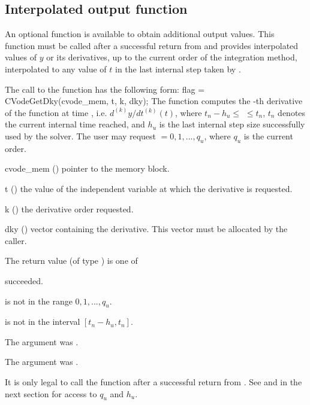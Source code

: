 \subsection{Interpolated output function}\label{ss:optional_dky}

An optional function  is available to obtain additional output
values.  This function must be called after a successful return from 
and provides interpolated values of $y$ or its derivatives, up to the current
order of the integration method, interpolated to any value of $t$ in the last
internal step taken by {\cvode}.

The call to the  function has the following form:
{
  flag = CVodeGetDky(cvode\_mem, t, k, dky);
}
{
  The function  computes the -th derivative of the 
  function at time , i.e. $d^{(k)}y/dt^{(k)} (t)$, where $t_n - h_u \le$
   $\le t_n$, $t_n$ denotes the current internal time reached, and $h_u$
  is the  last internal step size successfully used by the solver.  The 
  user may request  $= 0, 1, ..., q_u$, where $q_u$ is the current order. 
}
{
  \begin{args}
  \item[cvode\_mem] ()
    pointer to the {\cvode} memory block.
  \item[t] () the value of the independent variable at
    which the derivative is requested.
  \item[k] () the derivative order requested.
  \item[dky] ()
    vector containing the derivative.
    This vector must be allocated by the caller. 
  \end{args}
}
{
  The return value  (of type ) is one of
  \begin{args} 
  \item[\Id{CV\_SUCCESS}]
     succeeded.
  \item[\Id{CV\_BAD\_K}] 
     is not in the range $0, 1, ..., q_u$.
  \item[\Id{CV\_BAD\_T}] 
     is not in the interval $[t_n - h_u , t_n]$.
  \item[\Id{CV\_BAD\_DKY}] 
    The  argument was .
  \item[\Id{CV\_MEM\_NULL}] 
    The  argument was .
  \end{args}

}
{
  It is only legal to call the function  after a 
  successful return from . See  
  and  in the next section for access to 
  $q_u$ and $h_u$.
}

